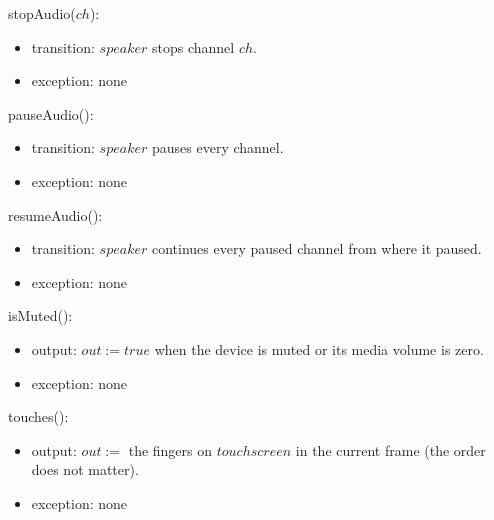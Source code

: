 \documentclass[10pt, titlepage]{article}
\newcommand{\T}[1]{\mathit{#1}}          %
\newcommand{\out}{\mathit{out}}
\newcommand{\true}{\mathit{true}}
\begin{document}
\begin{samepage}
\noindent stopAudio($\T{ch}$):
\begin{itemize}
\item transition: $\T{speaker}$ stops channel $\T{ch}$.
\item exception: none
\end{itemize}
\end{samepage}
\par\pagebreak[0]

\begin{samepage}
\noindent pauseAudio():
\begin{itemize}
\item transition: $\T{speaker}$ pauses every channel.
\item exception: none
\end{itemize}
\end{samepage}
\par\pagebreak[0]

\begin{samepage}
\noindent resumeAudio():
\begin{itemize}
\item transition: $\T{speaker}$ continues every paused channel from where it
  paused.
\item exception: none
\end{itemize}
\end{samepage}
\par\pagebreak[0]

\begin{samepage}
\noindent isMuted():
\begin{itemize}
\item output: $\out := \true$ when the device is muted or its media volume is
  zero.
\item exception: none
\end{itemize}
\end{samepage}
\par\pagebreak[0]

\begin{samepage}
\noindent touches():
\begin{itemize}
\item output: $\out :=$ the fingers on $\T{touchscreen}$ in the current frame
  (the order does not matter).
\item exception: none
\end{itemize}
\end{samepage}
\par\pagebreak[0]
\end{document}
